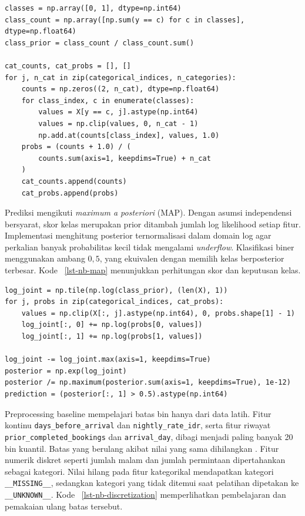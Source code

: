 \begin{lstlisting}[caption={Estimasi prior kelas dan peluang kategori dengan Laplace smoothing},label={lst-nb-counts}]
classes = np.array([0, 1], dtype=np.int64)
class_count = np.array([np.sum(y == c) for c in classes], dtype=np.float64)
class_prior = class_count / class_count.sum()

cat_counts, cat_probs = [], []
for j, n_cat in zip(categorical_indices, n_categories):
    counts = np.zeros((2, n_cat), dtype=np.float64)
    for class_index, c in enumerate(classes):
        values = X[y == c, j].astype(np.int64)
        values = np.clip(values, 0, n_cat - 1)
        np.add.at(counts[class_index], values, 1.0)
    probs = (counts + 1.0) / (
        counts.sum(axis=1, keepdims=True) + n_cat
    )
    cat_counts.append(counts)
    cat_probs.append(probs)
\end{lstlisting}

Prediksi mengikuti \textit{maximum a posteriori} (MAP). Dengan asumsi
independensi bersyarat, skor kelas merupakan prior ditambah jumlah log
likelihood setiap fitur. Implementasi menghitung posterior ternormalisasi
dalam domain log agar perkalian banyak probabilitas kecil tidak mengalami
\textit{underflow}. Klasifikasi biner menggunakan ambang $0{,}5$, yang
ekuivalen dengan memilih kelas berposterior terbesar. Kode
~\ref{lst-nb-map} menunjukkan perhitungan skor dan keputusan kelas.

\begin{lstlisting}[caption={Skor posterior dan keputusan MAP untuk baseline kategorikal},label={lst-nb-map}]
log_joint = np.tile(np.log(class_prior), (len(X), 1))
for j, probs in zip(categorical_indices, cat_probs):
    values = np.clip(X[:, j].astype(np.int64), 0, probs.shape[1] - 1)
    log_joint[:, 0] += np.log(probs[0, values])
    log_joint[:, 1] += np.log(probs[1, values])

log_joint -= log_joint.max(axis=1, keepdims=True)
posterior = np.exp(log_joint)
posterior /= np.maximum(posterior.sum(axis=1, keepdims=True), 1e-12)
prediction = (posterior[:, 1] > 0.5).astype(np.int64)
\end{lstlisting}

Preprocessing baseline mempelajari batas bin hanya dari data latih.
Fitur kontinu \texttt{days\_before\_arrival} dan
\texttt{nightly\_rate\_idr}, serta fitur riwayat
\texttt{prior\_completed\_bookings} dan \texttt{arrival\_day}, dibagi menjadi
paling banyak 20 bin kuantil. Batas yang berulang akibat nilai yang sama
dihilangkan \cite{dougherty1995discretization}. Fitur numerik diskret seperti
jumlah malam dan jumlah permintaan
dipertahankan sebagai kategori. Nilai hilang pada fitur kategorikal
mendapatkan kategori \texttt{\_\_MISSING\_\_}, sedangkan kategori yang tidak
ditemui saat pelatihan dipetakan ke \texttt{\_\_UNKNOWN\_\_}. Kode
~\ref{lst-nb-discretization} memperlihatkan pembelajaran dan pemakaian ulang
batas tersebut.

